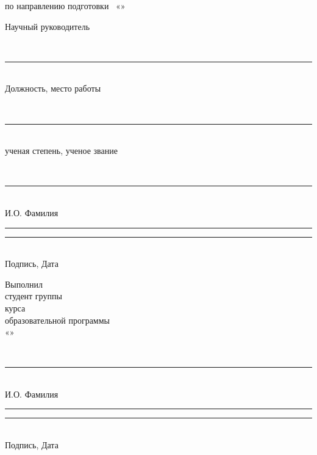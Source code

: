 \begin{titlepage}
\begin{center}
\vspace{0.35cm}
по направлению подготовки \hseProgramCode\ «\hseSpecialization»
\end{center}

\vspace{0.75cm}

\noindent
\begin{minipage}[t]{0.42\textwidth}
\raggedright
Научный руководитель

\vspace{0.18cm}
\strut\hseSupervisorTitle\\[-0.05cm]
\rule{6.1cm}{0.4pt}\\[-0.05cm]
{\scriptsize Должность, место работы}

\vspace{0.08cm}
\strut\hseSupervisorDegree\\[-0.05cm]
\rule{6.1cm}{0.4pt}\\[-0.05cm]
{\scriptsize ученая степень, ученое звание}

\vspace{0.08cm}
\strut\hseSupervisorName\\[-0.05cm]
\rule{6.1cm}{0.4pt}\\[-0.05cm]
{\scriptsize И.О. Фамилия}

\vspace{0.08cm}
\rule{3.6cm}{0.4pt}\quad\rule{2.2cm}{0.4pt}\\[-0.05cm]
{\scriptsize Подпись, Дата}
\end{minipage}
\hfill
\begin{minipage}[t]{0.42\textwidth}
\raggedright
Выполнил\\
студент группы \hseGroup\\
\hseCourse{} курса \hseDegreeLevel\\
образовательной программы\\
«\hseSpecialization»

\vspace{0.25cm}
\strut\hseAuthorName\\[-0.05cm]
\rule{6.1cm}{0.4pt}\\[-0.05cm]
{\scriptsize И.О. Фамилия}

\vspace{0.18cm}
\rule{3.6cm}{0.4pt}\quad\rule{2.2cm}{0.4pt}\\[-0.05cm]
{\scriptsize Подпись, Дата}
\end{minipage}

\ifhseHasCoSupervisor
\vspace{0.35cm}


\end{titlepage}
